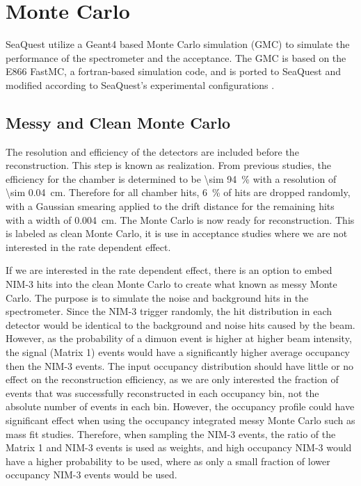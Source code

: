 \documentclass[../main.tex]{subfiles}
\begin{document}
\section{Monte Carlo}
\label{sec:MC}
SeaQuest utilize a Geant4 based Monte Carlo simulation (GMC) to simulate the
performance of the spectrometer and the acceptance. The GMC is based on the
E866 FastMC, a fortran-based simulation code, and is ported to SeaQuest and
modified according to SeaQuest’s experimental configurations \cite{kerns2018,prasad2020}.

\subsection{Messy and Clean Monte Carlo}
\label{subsec:messyMC}
The resolution and efficiency of the detectors are included before the reconstruction.
This step is known as realization.
From previous studies, the efficiency for the chamber is determined to be \SI{\sim 94}{\percent}
with a resolution of \SI{\sim 0.04}{\cm}. Therefore for all chamber hits, \SI{6}{\percent} of
hits are dropped randomly, with a Gaussian smearing applied to the drift distance for the remaining
hits with a width of \SI{0.004}{\cm}. The Monte Carlo is now ready for reconstruction. This is
labeled as clean Monte Carlo, it is use in acceptance studies where we are not interested in the
rate dependent effect.

If we are interested in the rate dependent effect, there is an option to embed NIM-3 hits into
the clean Monte Carlo to create what known as messy Monte Carlo.
The purpose is to simulate the noise and background hits in the spectrometer.
Since the NIM-3 trigger randomly, the hit distribution in each detector would be identical to
the background and noise hits caused by the beam. However, as the probability of a dimuon event
is higher at higher beam intensity, the signal (Matrix 1) events would have a significantly higher
average occupancy then the NIM-3 events. The input occupancy distribution should have little or no
effect on the reconstruction efficiency, as we are only interested the fraction of events that was
successfully reconstructed in each occupancy bin, not the absolute number of events in each bin.
However, the occupancy profile could have significant effect when using the occupancy integrated
messy Monte Carlo such as mass fit studies. Therefore, when sampling the NIM-3 events, the ratio
of the Matrix 1 and NIM-3 events is used as weights, and high occupancy NIM-3 would have a higher
probability to be used, where as only a small fraction of lower occupancy NIM-3 events would be used.
\end{document}
